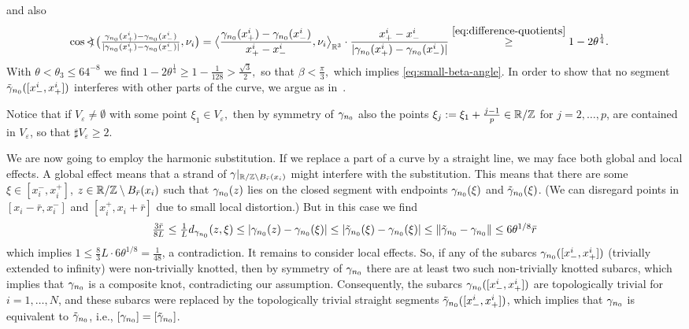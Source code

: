 and also
\begin{align*}
\textstyle
\cos\mathop{\mbox{$<\!\!\!)$}}\nolimits\big(\frac{\gamma_{n_0}(x_+^i)-\gamma_{n_0}(x_-^i)}{
|\gamma_{n_0}(x_+^i)-\gamma_{n_0}(x_-^i)|},\nu_i\big)& =
\big\langle
\frac{\gamma_{n_0}(x_+^i)-\gamma_{n_0}(x_-^i)}{x_+^i-x_-^i},\nu_i
\big\rangle_{\mathbb{R}^3}\cdot\frac{x_+^i-x_-^i}{|\gamma_{n_0}(x_+^i)-\gamma_{n_0}(x_-^i)|}
\overset{\eqref{eq:difference-quotients}}{\ge}
1-2\theta^\frac14.
\end{align*}
With $\theta<\theta_3\le 64^{-8}$ we find $1-2\theta^\frac14\ge 1-\frac1{128}
>\frac{\sqrt{3}}2,$ so that $\beta
<\frac{\pi}3,$
which implies \eqref{eq:small-beta-angle}.
In order to show that no segment $\tilde{\gamma}_{n_0}([x_-^i,x_+^i])$
interferes with other parts of the curve, we argue as in~\cite[(I.6), p.~150]{crowell-fox_1977}.

Notice that if $V_\varepsilon\not=\emptyset$ with  some point
$\xi_1\in V_{\varepsilon},$ then by symmetry of $\gamma_{n_0}$ also the 
points $\xi_j:=\xi_1+\frac{j-1}p\in\mathbb{R}/\mathbb{Z}$ for $j=2,\ldots,p$, are contained
in $V_\varepsilon$, 
so that $\sharp V_\varepsilon\ge 2$.

We are now going to employ the harmonic substitution.
If we replace a part of a curve by a straight line, we may face both global and local effects.
A global effect means that a strand of $\gamma|_{\mathbb{R}/\mathbb{Z}\setminus B_{\bar r}(x_i)}$ might interfere
with the substitution.
This means that there are some $\xi\in[x_i^-,x_i^+]$, $z\in \mathbb{R}/\mathbb{Z}\setminus B_{\bar r}(x_i)$
such that $\gamma_{n_0}(z)$ lies on the closed
segment with endpoints $\gamma_{n_0}(\xi)$ and 
$\tilde{\gamma}_{n_0}(\xi)$. 
(We can disregard points in $[x_i-\bar r,x_i^-]$ and $[x_i^+,x_i+\bar r]$ due to small local distortion.)
But in this case we find
\[ \textstyle \frac{3\bar r}{8L}\le \frac1Ld_{\gamma_{n_0}}(z,\xi)\le |\gamma_{n_0}(z)-\gamma_{n_0}(\xi)|
\le |\tilde{\gamma}_{n_0}(\xi)-\gamma_{n_0}(\xi)| \le \|\tilde{\gamma}_{n_0}-\gamma_{n_0}\| \le 6\theta^{1/8}\bar r \]
which implies $1\le\frac83L\cdot6\theta^{1/8}=\frac1{48}$, a contradiction.
It remains to consider local effects.
So,
if any of the subarcs $\gamma_{n_0}([x_-^i,x_+^i])$ (trivially extended to
infinity) were non-trivially knotted, then by symmetry of $\gamma_{n_0}$
there are at least two such non-trivially knotted subarcs, which implies
that $\gamma_{n_0}$ is a composite knot, contradicting our assumption.
Consequently, the subarcs $\gamma_{n_0}([x_-^i,x_+^i])$ are topologically
trivial for $i=1,\ldots,N$, and these subarcs were replaced by the
topologically trivial straight segments $\tilde{\gamma}_{n_0}(
[x_-^i,x_+^i])$, which implies that $\gamma_{n_0}$ is equivalent to
$\tilde{\gamma}_{n_0}$, i.e., $[\gamma_{n_0}]=[\tilde{\gamma}_{n_0}]$.


